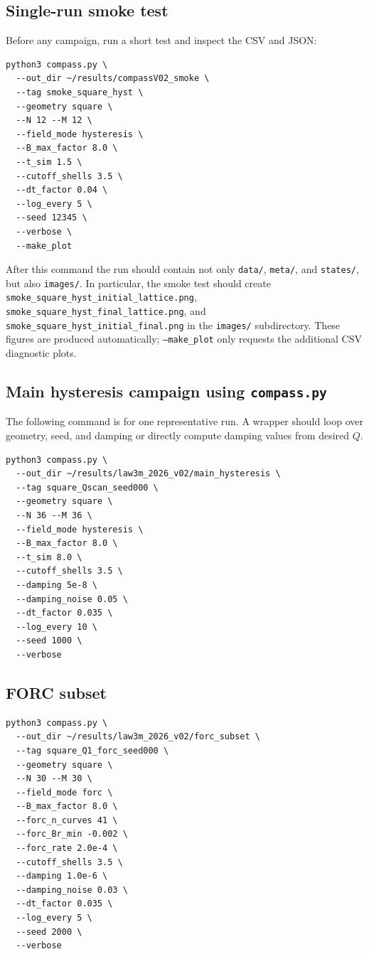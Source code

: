 \documentclass[11pt,a4paper]{article}
\newcommand{\code}[1]{\texttt{#1}}
\begin{document}
\subsection{Single-run smoke test}

Before any campaign, run a short test and inspect the CSV and JSON:

\begin{lstlisting}[style=bashstyle]
python3 compass.py \
  --out_dir ~/results/compassV02_smoke \
  --tag smoke_square_hyst \
  --geometry square \
  --N 12 --M 12 \
  --field_mode hysteresis \
  --B_max_factor 8.0 \
  --t_sim 1.5 \
  --cutoff_shells 3.5 \
  --dt_factor 0.04 \
  --log_every 5 \
  --seed 12345 \
  --verbose \
  --make_plot
\end{lstlisting}

After this command the run should contain not only \code{data/}, \code{meta/}, and \code{states/}, but also \code{images/}. In particular, the smoke test should create \code{smoke\_square\_hyst\_initial\_lattice.png}, \code{smoke\_square\_hyst\_final\_lattice.png}, and \code{smoke\_square\_hyst\_initial\_final.png} in the \code{images/} subdirectory. These figures are produced automatically; \code{--make\_plot} only requests the additional CSV diagnostic plots.

\subsection{Main hysteresis campaign using \code{compass.py}}

The following command is for one representative run. A wrapper should loop over geometry, seed, and damping or directly compute damping values from desired $Q$.

\begin{lstlisting}[style=bashstyle]
python3 compass.py \
  --out_dir ~/results/law3m_2026_v02/main_hysteresis \
  --tag square_Qscan_seed000 \
  --geometry square \
  --N 36 --M 36 \
  --field_mode hysteresis \
  --B_max_factor 8.0 \
  --t_sim 8.0 \
  --cutoff_shells 3.5 \
  --damping 5e-8 \
  --damping_noise 0.05 \
  --dt_factor 0.035 \
  --log_every 10 \
  --seed 1000 \
  --verbose
\end{lstlisting}

\subsection{FORC subset}

\begin{lstlisting}[style=bashstyle]
python3 compass.py \
  --out_dir ~/results/law3m_2026_v02/forc_subset \
  --tag square_Q1_forc_seed000 \
  --geometry square \
  --N 30 --M 30 \
  --field_mode forc \
  --B_max_factor 8.0 \
  --forc_n_curves 41 \
  --forc_Br_min -0.002 \
  --forc_rate 2.0e-4 \
  --cutoff_shells 3.5 \
  --damping 1.0e-6 \
  --damping_noise 0.03 \
  --dt_factor 0.035 \
  --log_every 5 \
  --seed 2000 \
  --verbose
\end{lstlisting}
\end{document}
